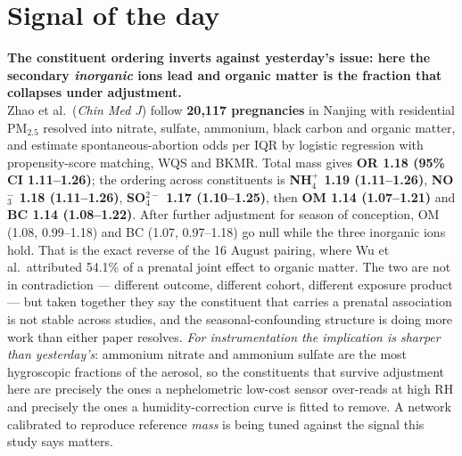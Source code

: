 \documentclass[10pt]{article}
\begin{document}
\vspace{6mm}

\section*{\sffamily\bfseries\color{Deep}Signal of the day}
\vspace{-1.5mm}{\color{Amber}\rule{\linewidth}{1.1pt}}\vspace{2.5mm}

\begin{keybox}
{\sffamily\bfseries\small\color{Deep}The constituent ordering inverts against yesterday's
issue: here the secondary \emph{inorganic} ions lead and organic matter is the fraction
that collapses under adjustment.}\\[1.4mm]
\footnotesize
Zhao et al.\ (\textit{Chin Med J}) follow \textbf{20{,}117 pregnancies} in Nanjing with
residential PM$_{2.5}$ resolved into nitrate, sulfate, ammonium, black carbon and organic
matter, and estimate spontaneous-abortion odds per IQR by logistic regression with
propensity-score matching, WQS and BKMR. Total mass gives
\textbf{OR 1.18 (95\% CI 1.11--1.26)}; the ordering across constituents is
\textbf{NH$_4^+$ 1.19 (1.11--1.26)}, \textbf{NO$_3^-$ 1.18 (1.11--1.26)},
\textbf{SO$_4^{2-}$ 1.17 (1.10--1.25)}, then \textbf{OM 1.14 (1.07--1.21)} and
\textbf{BC 1.14 (1.08--1.22)}. After further adjustment for season of conception, OM
(1.08, 0.99--1.18) and BC (1.07, 0.97--1.18) go null while the three inorganic ions hold.
That is the exact reverse of the 16 August pairing, where Wu et al.\ attributed 54.1\% of a
prenatal joint effect to organic matter. The two are not in contradiction --- different
outcome, different cohort, different exposure product --- but taken together they say the
constituent that carries a prenatal association is not stable across studies, and the
seasonal-confounding structure is doing more work than either paper resolves.
\emph{For instrumentation the implication is sharper than yesterday's}: ammonium nitrate
and ammonium sulfate are the most hygroscopic fractions of the aerosol, so the constituents
that survive adjustment here are precisely the ones a nephelometric low-cost sensor
over-reads at high RH and precisely the ones a humidity-correction curve is fitted to
remove. A network calibrated to reproduce reference \emph{mass} is being tuned against the
signal this study says matters.
\end{keybox}
\end{document}
